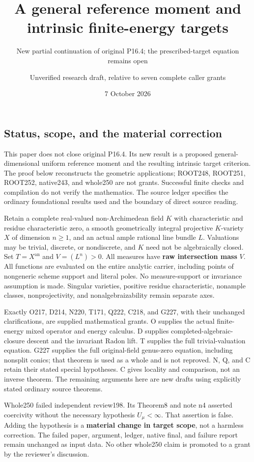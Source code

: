 \documentclass[
  11pt,
]{article}
\title{A general reference moment and intrinsic finite-energy targets}
\subtitle{New partial continuation of original P16.4; the
prescribed-target equation remains open}
\author{Unverified research draft, relative to seven complete caller
grants}
\date{7 October 2026}
\begin{document}
\maketitle

\subsection{Status, scope, and the material
correction}\label{status-scope-and-the-material-correction}

This paper does not close original P16.4. Its new result is a proposed
general-dimensional uniform reference moment and the resulting intrinsic
target criterion. The proof below reconstructs the geometric
applications; ROOT248, ROOT251, ROOT252, native243, and whole250 are not
grants. Successful finite checks and compilation do not verify the
mathematics. The source ledger specifies the ordinary foundational
results used and the boundary of direct source reading.

Retain a complete real-valued non-Archimedean field \(K\) with
characteristic and residue characteristic zero, a smooth geometrically
integral projective \(K\)-variety \(X\) of dimension \(n\geq1\), and an
actual ample rational line bundle \(L\). Valuations may be trivial,
discrete, or nondiscrete, and \(K\) need not be algebraically closed.
Set \(T=X^{\mathrm{an}}\) and \(V=(L^n)>0\). All measures have
\textbf{raw intersection mass} \(V\). All functions are evaluated on the
entire analytic carrier, including points of nongeneric scheme support
and literal poles. No measure-support or invariance assumption is made.
Singular varieties, positive residue characteristic, nonample classes,
nonprojectivity, and nonalgebraizability remain separate axes.

Exactly O217, D214, N220, T171, Q222, C218, and G227, with their
unchanged clarifications, are supplied mathematical grants. O supplies
the actual finite-energy mixed operator and energy calculus. D supplies
completed-algebraic-closure descent and the invariant Radon lift. T
supplies the full trivial-valuation equation. G227 supplies the full
original-field genus-zero equation, including nonsplit conics; that
theorem is used as a whole and is not reproved. N, Q, and C retain their
stated special hypotheses. C gives locality and comparison, not an
inverse theorem. The remaining arguments here are new drafts using
explicitly stated ordinary source theorems.

Whole250 failed independent review198. Its Theorem8 and note n4 asserted
coercivity without the necessary hypothesis \(U_\mu<\infty\). That
assertion is false. Adding the hypothesis is a \textbf{material change
in target scope}, not a harmless correction. The failed paper, argument,
ledger, native final, and failure report remain unchanged as input data.
No other whole250 claim is promoted to a grant by the reviewer's
discussion.
\end{document}
